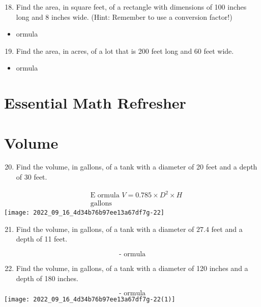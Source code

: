 \begin{enumerate}
\begin{enumerate}
  \setcounter{enumi}{17}
  \item Find the area, in square feet, of a rectangle with dimensions of 100 inches long and 8 inches wide. (Hint: Remember to use a conversion factor!)
\end{enumerate}
\begin{itemize}
  \item ormula
\end{itemize}
\begin{enumerate}
  \setcounter{enumi}{18}
  \item Find the area, in acres, of a lot that is 200 feet long and 60 feet wide.
\end{enumerate}
\begin{itemize}
  \item ormula
\end{itemize}
\section{Essential Math Refresher}
\section{Volume}
\begin{enumerate}
  \setcounter{enumi}{19}
  \item Find the volume, in gallons, of a tank with a diameter of 20 feet and a depth of 30 feet.
\end{enumerate}
$$
\begin{aligned}
& \text { E ormula } V=0.785 \times D^{2} \times H \\
& \text { gallons }
\end{aligned}
$$
\texttt{[image: 2022\_09\_16\_4d34b76b97ee13a67df7g-22]}

\begin{enumerate}
  \setcounter{enumi}{20}
  \item Find the volume, in gallons, of a tank with a diameter of $27.4$ feet and a depth of 11 feet.
\end{enumerate}
$$
\text { - ormula }
$$

\begin{enumerate}
  \setcounter{enumi}{21}
  \item Find the volume, in gallons, of a tank with a diameter of 120 inches and a depth of 180 inches.
\end{enumerate}
$$
\text { - ormula }
$$
\texttt{[image: 2022\_09\_16\_4d34b76b97ee13a67df7g-22(1)]}


\end{enumerate}
